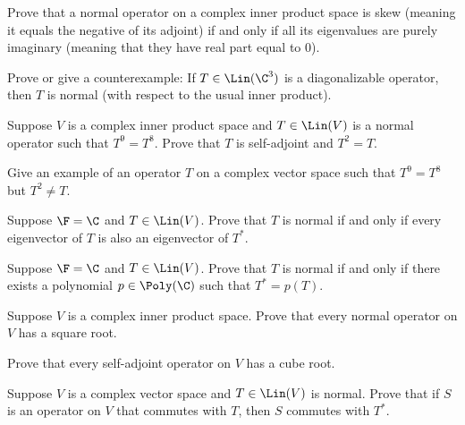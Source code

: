 \begin{exercise}
Prove that a normal operator on a complex inner product space is skew (meaning
it equals the negative of its adjoint) if and only if all its eigenvalues are
purely imaginary (meaning that they have real part equal to $0$).
\end{exercise}

\begin{exercise}
Prove or give a counterexample: If $T\in\Lin(\C^3)$ is a diagonalizable
operator, then $T$ is normal (with respect to the usual inner product).
\end{exercise}

\begin{exercise}
Suppose $V$ is a complex inner product space and $T\in\Lin(V)$ is a normal
operator such that $T^9=T^8$. Prove that $T$ is self-adjoint and $T^2=T$.
\end{exercise}

\begin{exercise}
Give an example of an operator $T$ on a complex vector space such that
$T^9=T^8$ but $T^2\ne T$.
\end{exercise}

\begin{exercise}
Suppose $\F=\C$ and $T\in\Lin(V)$. Prove that $T$ is normal if and only if
every eigenvector of $T$ is also an eigenvector of $T^*$.
\end{exercise}

\begin{exercise}
Suppose $\F=\C$ and $T\in\Lin(V)$. Prove that $T$ is normal if and only if
there exists a polynomial $p\in\Poly(\C)$ such that $T^*=p(T)$.
\end{exercise}

\begin{exercise}
Suppose $V$ is a complex inner product space. Prove that every normal operator
on $V$ has a square root.
\end{exercise}

\begin{exercise}
Prove that every self-adjoint operator on $V$ has a cube root.
\end{exercise}

\begin{exercise}
Suppose $V$ is a complex vector space and $T\in\Lin(V)$ is normal. Prove that
if $S$ is an operator on $V$ that commutes with $T$, then $S$ commutes with
$T^*$.
\end{exercise}

